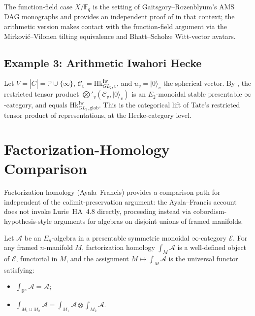 \begin{remark}
\label{v4-arith:tate:rem:ff-vs-arith}
The function-field case \(X/\mathbb{F}_{q}\) is the setting of
Gaitsgory--Rozenblyum's AMS DAG monographs and provides an
independent proof of  in that
context; the arithmetic version makes contact with the
function-field argument via the Mirkovi\'c--Vilonen tilting
equivalence and Bhatt--Scholze Witt-vector avatars.
\end{remark}

\subsection{Example 3: Arithmetic Iwahori Hecke}

\begin{example}
\label{v4-arith:tate:ex:arith-iwahori}
Let \(V=|\overline{C}|=\mathbb{P}\cup\{\infty\}\),
\(\mathcal{C}_{v}=\mathrm{Hk}^{\mathrm{Iw}}_{GL_{2},v}\), and
\(u_{v}=|0\rangle_{v}\) the spherical vector. By
, the restricted tensor product
\(\bigotimes'_{v}(\mathcal{C}_{v},|0\rangle_{v})\) is an
\(E_{2}\)-monoidal stable presentable \(\infty\)-category, and equals
\(\mathrm{Hk}^{\mathrm{Iw}}_{GL_{2},\mathrm{glob}}\). This is the
categorical lift of Tate's restricted tensor product of
representations, at the Hecke-category level.
\end{example}

\section{Factorization-Homology Comparison}
\label{v4-arith:tate:verification}

Factorization homology (Ayala--Francis) provides a comparison path
for  independent of the
colimit-preservation argument: the Ayala--Francis account does not
invoke Lurie~HA~4.8 directly, proceeding instead via
cobordism-hypothesis-style arguments for algebras on disjoint unions
of framed manifolds.

\begin{setup}
\label{v4-arith:tate:setup:factorization-homology}
Let \(\mathcal{A}\) be an \(E_{n}\)-algebra in a presentable symmetric
monoidal \(\infty\)-category \(\mathcal{E}\). For any framed
\(n\)-manifold \(M\), factorization homology \(\int_{M}\mathcal{A}\) is
a well-defined object of \(\mathcal{E}\), functorial in \(M\), and the
assignment \(M\mapsto\int_{M}\mathcal{A}\) is the universal functor
satisfying:
\begin{itemize}
\item \(\int_{\mathbb{R}^{n}}\mathcal{A}=\mathcal{A}\);
\item \(\int_{M_{1}\sqcup M_{2}}\mathcal{A}=\int_{M_{1}}\mathcal{A}\otimes\int_{M_{2}}\mathcal{A}\).
\end{itemize}
\end{setup}

